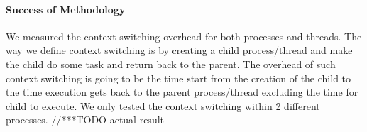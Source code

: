 \paragraph{Success of Methodology}
We measured the context switching overhead for both processes and threads. The way we define context switching is by creating a child process/thread and make the child do some task and return back to the parent. The overhead of such context switching is going to be the time start from the creation of the child to the time execution gets back to the parent process/thread excluding the time for child to execute. We only tested the context switching within 2 different processes.
//***TODO actual result


